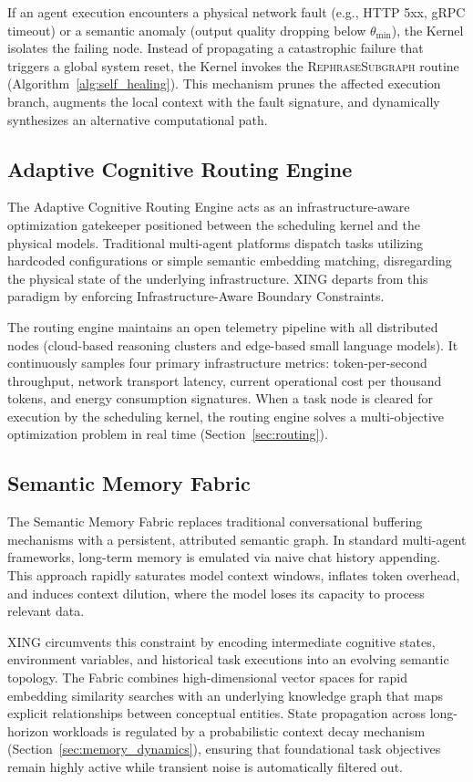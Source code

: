 \documentclass[conference]{IEEEtran}
\begin{document}
If an agent execution encounters a physical network fault (e.g., HTTP 5xx, gRPC timeout) or a semantic anomaly (output quality dropping below $\theta_{\min}$), the Kernel isolates the failing node. Instead of propagating a catastrophic failure that triggers a global system reset, the Kernel invokes the \textsc{RephraseSubgraph} routine (Algorithm~\ref{alg:self_healing}). This mechanism prunes the affected execution branch, augments the local context with the fault signature, and dynamically synthesizes an alternative computational path.

\subsection{Adaptive Cognitive Routing Engine}

The Adaptive Cognitive Routing Engine acts as an infrastructure-aware optimization gatekeeper positioned between the scheduling kernel and the physical models. Traditional multi-agent platforms dispatch tasks utilizing hardcoded configurations or simple semantic embedding matching, disregarding the physical state of the underlying infrastructure. XING departs from this paradigm by enforcing Infrastructure-Aware Boundary Constraints.

The routing engine maintains an open telemetry pipeline with all distributed nodes (cloud-based reasoning clusters and edge-based small language models). It continuously samples four primary infrastructure metrics: token-per-second throughput, network transport latency, current operational cost per thousand tokens, and energy consumption signatures. When a task node is cleared for execution by the scheduling kernel, the routing engine solves a multi-objective optimization problem in real time (Section~\ref{sec:routing}).

\subsection{Semantic Memory Fabric}

The Semantic Memory Fabric replaces traditional conversational buffering mechanisms with a persistent, attributed semantic graph. In standard multi-agent frameworks, long-term memory is emulated via naive chat history appending. This approach rapidly saturates model context windows, inflates token overhead, and induces context dilution, where the model loses its capacity to process relevant data.

XING circumvents this constraint by encoding intermediate cognitive states, environment variables, and historical task executions into an evolving semantic topology. The Fabric combines high-dimensional vector spaces for rapid embedding similarity searches with an underlying knowledge graph that maps explicit relationships between conceptual entities. State propagation across long-horizon workloads is regulated by a probabilistic context decay mechanism (Section~\ref{sec:memory_dynamics}), ensuring that foundational task objectives remain highly active while transient noise is automatically filtered out.
\end{document}

